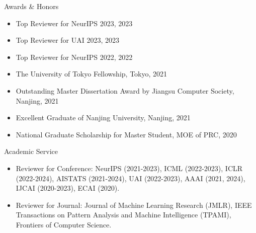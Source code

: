 \documentclass{resume} %
\begin{document}



\begin{rSection}{Awards \& Honors}
\begin{itemize}[leftmargin=*]
\item Top Reviewer for NeurIPS 2023, 2023
\item Top Reviewer for UAI 2023, 2023
\item Top Reviewer for NeurIPS 2022, 2022
\item The University of Tokyo Fellowship, Tokyo, 2021
\item Outstanding Master Dissertation Award by Jiangsu Computer Society, Nanjing, 2021
\item Excellent Graduate of Nanjing University, Nanjing, 2021
\item National Graduate Scholarship for Master Student, MOE of PRC, 2020
\end{itemize}
\end{rSection}

\begin{rSection}{Academic Service}
\begin{itemize}[leftmargin=*]
\item Reviewer for Conference: NeurIPS (2021-2023), ICML (2022-2023), ICLR (2022-2024), AISTATS (2021-2024), UAI (2022-2023), AAAI (2021, 2024), IJCAI (2020-2023), ECAI (2020).
\item Reviewer for Journal: Journal of Machine Learning Research (JMLR), IEEE Transactions on Pattern Analysis and Machine Intelligence (TPAMI), Frontiers of Computer Science.
\end{itemize}

\end{rSection}
\end{document}
